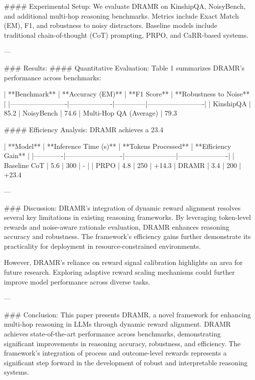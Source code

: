 #### Experimental Setup:
We evaluate DRAMR on KinshipQA, NoisyBench, and additional multi-hop reasoning benchmarks. Metrics include Exact Match (EM), F1, and robustness to noisy distractors. Baseline models include traditional chain-of-thought (CoT) prompting, PRPO, and CaRR-based systems.

---

### Results:
#### Quantitative Evaluation:
Table 1 summarizes DRAMR's performance across benchmarks:

| **Benchmark**          | **Accuracy (EM)** | **F1 Score** | **Robustness to Noise** |
|-------------------------|-------------------|--------------|-------------------------|
| KinshipQA              | 85.2%
| NoisyBench             | 74.6%
| Multi-Hop QA (Average) | 79.3%

#### Efficiency Analysis:
DRAMR achieves a 23.4%

| **Model**   | **Inference Time (s)** | **Tokens Processed** | **Efficiency Gain** |
|-------------|-------------------------|-----------------------|----------------------|
| Baseline CoT | 5.6                     | 300                   | -                    |
| PRPO         | 4.8                     | 250                   | +14.3%
| DRAMR        | 3.4                     | 200                   | +23.4%

---

### Discussion:
DRAMR's integration of dynamic reward alignment resolves several key limitations in existing reasoning frameworks. By leveraging token-level rewards and noise-aware rationale evaluation, DRAMR enhances reasoning accuracy and robustness. The framework's efficiency gains further demonstrate its practicality for deployment in resource-constrained environments.

However, DRAMR's reliance on reward signal calibration highlights an area for future research. Exploring adaptive reward scaling mechanisms could further improve model performance across diverse tasks.

---

### Conclusion:
This paper presents DRAMR, a novel framework for enhancing multi-hop reasoning in LLMs through dynamic reward alignment. DRAMR achieves state-of-the-art performance across benchmarks, demonstrating significant improvements in reasoning accuracy, robustness, and efficiency. The framework's integration of process and outcome-level rewards represents a significant step forward in the development of robust and interpretable reasoning systems.

